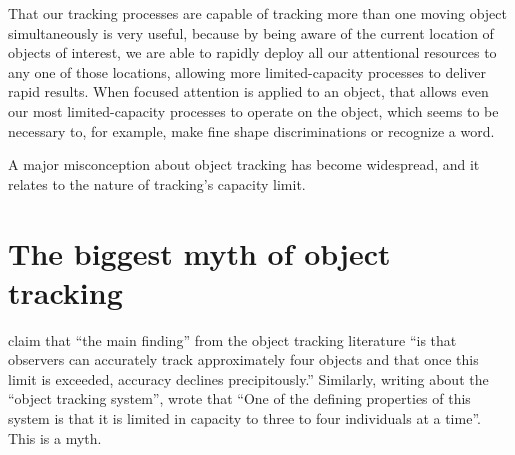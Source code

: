 \documentclass[
]{book}
\begin{document}
That our tracking processes are capable of tracking more than one moving object simultaneously is very useful, because by being aware of the current location of objects of interest, we are able to rapidly deploy all our attentional resources to any one of those locations, allowing more limited-capacity processes to deliver rapid results. When focused attention is applied to an object, that allows even our most limited-capacity processes to operate on the object, which seems to be necessary to, for example, make fine shape discriminations or recognize a word.

A major misconception about object tracking has become widespread, and it relates to the nature of tracking's capacity limit.

\hypertarget{biggestMyth}{%
\chapter{The biggest myth of object tracking}\label{biggestMyth}}

\citet{doranRoleVisualAttention2010} claim that ``the main finding'' from the object tracking literature ``is that observers can accurately track approximately four objects and that once this limit is exceeded, accuracy declines precipitously.'' Similarly, writing about the ``object tracking system'', \citet{piazzaNeurocognitiveStartupTools2010} wrote that ``One of the defining properties of this system is that it is limited in capacity to three to four individuals at a time''. This is a myth.
\end{document}
